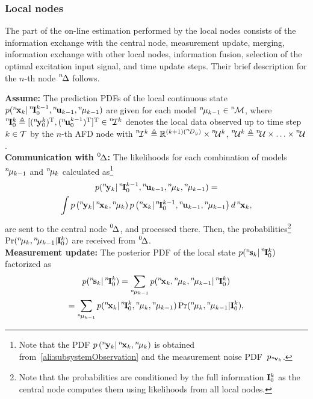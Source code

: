 \documentclass[conference,10pt]{IEEEtran}
\def\zeroth{\prescript{0\!}{}}
\def\nth{\prescript{n\!}{}}
\begin{document}
\subsubsection{Local nodes}\label{sec:local_nodes}
The part of the on-line estimation performed by the local nodes consists of the information exchange with the central node, measurement update, merging, information exchange with other local nodes, information fusion, selection of the optimal excitation input signal, and time update steps. Their brief description for the $n$-th node $\nth{\Delta}$ follows.

\textbf{Assume:} The prediction PDFs of the local continuous state $p(\nth{\bfx}_{k}\vert\nth{\bfI}^{k-1}_{0},\nth{\bfu}_{k-1},\nth{\mu}_{k-1})$ are given for each model $\nth{\mu}_{k-1}\in\nth{\mcM}$, where $\nth{\bfI}_0^k\triangleq[(\nth{\bfy}_{0}^{k})^{\T},(\nth{\bfu}_{0}^{k-1})^{\T}]^{\T}\in\nth{\mcI}^k$ denotes the local data observed up to time step $k \in \mathcal{T}$ by the $n$-th AFD node with $\nth{\mcI}^{k}\triangleq\bbR^{(k+1)(\nth{D}_y)}\times\nth{\mcU}^{k}$, $\nth{\mcU}^{k}\triangleq\nth{\mcU}\times\ldots\times\nth{\mcU}$.\\
\textbf{Communication with $\zeroth{\Delta}$:} The likelihoods for each combination of models $\nth{\mu}_{k-1}$ and $\nth{\mu}_k$ calculated as\footnote{Note that the PDF $p\left(\nth{\bfy}_{k}\vert\nth{\bfx}_{k},\nth{\mu}_k\right)$ is obtained from~\eqref{ali:subsystemObservation} and the measurement noise PDF~$p_{\nth{\bfv}_k}$.}
\begin{multline*}
  p(\nth{\bfy}_k\vert\nth{\bfI}_0^{k-1},\nth{\bfu}_{k-1},\nth{\mu}_k,\nth{\mu}_{k-1})=\\
  \int p\left(\nth{\bfy}_{k} \vert\nth{\bfx}_{k},\nth{\mu}_k\right) 
  p\left(\nth{\bfx}_{k}\vert
  \nth{\bfI}^{k-1}_{0},\nth{\bfu}_{k-1},\nth{\mu}_{k-1}\right)d\nth{\bfx}_k,
 \end{multline*}
are sent to the central node $\zeroth{\Delta}$, and processed there.
Then, the probabilities\footnote{Note that the probabilities are conditioned by the full information $\mathbf{I}_0^k$ as the central node computes them using likelihoods from all local nodes.} $\Pr(\nth{\mu}_k,\nth{\mu}_{k-1}|\bfI_0^k)$ are received from $\zeroth{\Delta}$.\\
\textbf{Measurement update:}
The posterior PDF of the local state $p(\nth{\bfs}_{k} \vert\nth{\bfI}^{k}_{0})$ factorized as
\begin{multline}\label{ali:PDF_BRR_Posterior}
  p(\nth{\bfs}_{k} \vert\nth{\bfI}^{k}_{0})=\sum_{\nth{\mu}_{k-1}} 
  p(\nth{\bfx}_{k},\nth{\mu}_k,\nth{\mu}_{k-1} \vert \nth{\bfI}^{k}_{0})
  \\=\sum_{\nth{\mu}_{k-1}}
  p(\nth{\bfx}_{k}\vert\nth{\bfI}^{k}_{0},\nth{\mu}_k,\nth{\mu}_{k-1})
  \Pr(\nth{\mu}_k,\nth{\mu}_{k-1} \vert \bfI^{k}_{0} ),
\end{multline}
\end{document}
